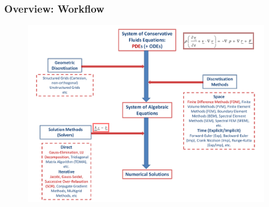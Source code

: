 \documentclass[10pt,compress,handout,ignorenonframetext]{beamer}
\begin{document}
\begin{frame}
 \frametitle{Overview: Workflow}

   \begin{figure}%
    \begin{center}
     \includegraphics[width=12.cm, height=7.8cm, clip]{./Figs/CFD_Schematics2.pdf}
    \end{center}
   \end{figure}    

\end{frame}
\end{document}
